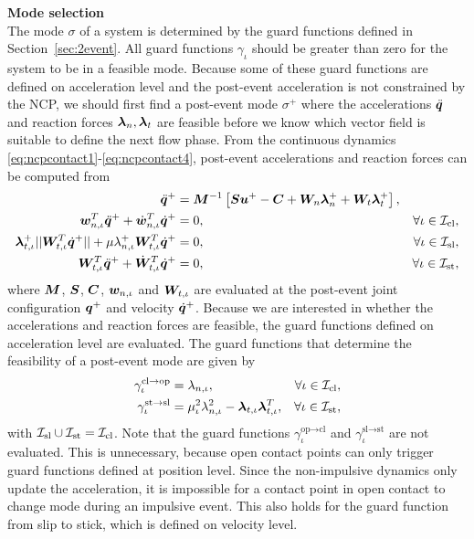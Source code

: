 \documentclass[../DC2017114Bouma.tex]{subfiles}
\begin{document}
\textbf{Mode selection}\\
The mode $\sigma$ of a system is determined by the guard functions defined in Section~\ref{sec:2event}. All guard functions $\gamma_\iota$ should be greater than zero for the system to be in a feasible mode. Because some of these guard functions are defined on acceleration level and the post-event acceleration is not constrained by the NCP, we should first find a post-event mode $\sigma^+$ where the accelerations $\ddot{{\boldsymbol{q}}}$ and reaction forces $\boldsymbol{\lambda}_{n},\boldsymbol{\lambda}_{t}$ are feasible before we know which vector field is suitable to define the next flow phase. From the continuous dynamics \eqref{eq:ncpcontact1}-\eqref{eq:ncpcontact4}, post-event accelerations and reaction forces can be computed from
\begin{align}
\ddot{{\boldsymbol{q}}}^+ &= {\boldsymbol{M}}^{-1}\left[{\boldsymbol{S}}{\boldsymbol{u}}^+ - {\boldsymbol{C}} + {\boldsymbol{W}}_{n}\boldsymbol{\lambda}^+_{n} + {\boldsymbol{W}}_{t}\boldsymbol{\lambda}^+_{t}\right], &  \label{eq:2nonimp1}\\
{\boldsymbol{w}}^T_{n,\iota}\ddot{{\boldsymbol{q}}}^+ + \dot{{\boldsymbol{w}}}^T_{n,\iota}\dot{{\boldsymbol{q}}}^+ &= 0, & \forall \iota\in\mathcal{I}_{\text{cl}},\label{eq:2nonimp2}\\
\boldsymbol{\lambda}^+_{t,\iota}||{\boldsymbol{W}}^T_{t,\iota}\dot{{\boldsymbol{q}}}^+|| + \mu\lambda^+_{n,\iota}{\boldsymbol{W}}^T_{t,\iota}\dot{{\boldsymbol{q}}}^+ &= 0, & \forall \iota\in\mathcal{I}_{\text{sl}},\label{eq:2nonimp3}\\
{\boldsymbol{W}}^T_{t,\iota}\ddot{{\boldsymbol{q}}}^+ + \dot{{\boldsymbol{W}}}^T_{t,\iota}\dot{{\boldsymbol{q}}}^+ &= 0, & \forall \iota\in\mathcal{I}_{\text{st}},\label{eq:2nonimp4}
\end{align}
where ${\boldsymbol{M}}$, ${\boldsymbol{S}}$, ${\boldsymbol{C}}$, ${\boldsymbol{w}}_{n,\iota}$ and ${\boldsymbol{W}}_{t,\iota}$ are evaluated at the post-event joint configuration ${\boldsymbol{q}}^+$ and velocity $\dot{{\boldsymbol{q}}}^+$. Because we are interested in whether the accelerations and reaction forces are feasible, the guard functions defined on acceleration level are evaluated. The guard functions that determine the feasibility of a post-event mode are given by
\begin{align}
\gamma^{\text{cl}\rightarrow\text{op}}_{\iota} &= \lambda_{n,\iota}, & \forall \iota\in\mathcal{I}_{\text{cl}},\\
\gamma^{\text{st}\rightarrow\text{sl}}_{\iota} &= \mu_{\iota}^2\lambda_{n,\iota}^2 - \boldsymbol{\lambda}_{t,\iota}\boldsymbol{\lambda}_{t,\iota}^T, & \forall \iota\in\mathcal{I}_{\text{st}},
\end{align}
with $\mathcal{I}_{\text{sl}}\cup\mathcal{I}_{\text{st}}=\mathcal{I}_{\text{cl}}$. Note that the guard functions $\gamma_{\iota}^{\text{op}\rightarrow\text{cl}}$ and $\gamma_{\iota}^{\text{sl}\rightarrow\text{st}}$ are not evaluated. This is unnecessary, because open contact points can only trigger guard functions defined at position level. Since the non-impulsive dynamics only update the acceleration, it is impossible for a contact point in open contact to change mode during an impulsive event. This also holds for the guard function from slip to stick, which is defined on velocity level.
\end{document}
